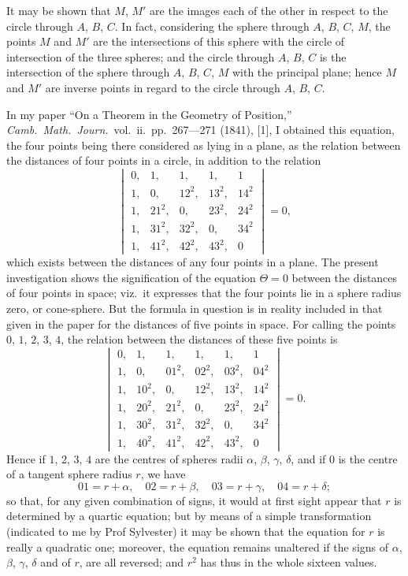 \documentclass[11pt,a4paper]{article}
\theoremstyle{plain}
\begin{document}
It may be shown that $M$, $M'$ are the images each of the other in respect to the circle through $A$, $B$, $C$. In fact, considering the sphere through $A$, $B$, $C$, $M$, the points $M$ and $M'$ are the intersections of this sphere with the circle of intersection of the three spheres; and the circle through $A$, $B$, $C$ is the intersection of the sphere through $A$, $B$, $C$, $M$ with the principal plane; hence $M$ and $M'$ are inverse points in regard to the circle through $A$, $B$, $C$.

\newpage
In my paper ``On a Theorem in the Geometry of Position,'' \textit{Camb.\ Math.\ Journ.}\ vol.\ ii.\ pp.\ 267---271 (1841), [1], I obtained this equation, the four points being there considered as lying in a plane, as the relation between the distances of four points in a circle, in addition to the relation
\[
\begin{vmatrix}
0, & 1, & 1, & 1, & 1 \\
1, & 0, & 12^2, & 13^2, & 14^2 \\
1, & 21^2, & 0, & 23^2, & 24^2 \\
1, & 31^2, & 32^2, & 0, & 34^2 \\
1, & 41^2, & 42^2, & 43^2, & 0
\end{vmatrix}
= 0,
\]
which exists between the distances of any four points in a plane. The present investigation shows the signification of the equation $\Theta = 0$ between the distances of four points in space; viz.\ it expresses that the four points lie in a sphere radius zero, or cone-sphere. But the formula in question is in reality included in that given in the paper for the distances of five points in space. For calling the points $0$, $1$, $2$, $3$, $4$, the relation between the distances of these five points is
\[
\begin{vmatrix}
0, & 1, & 1, & 1, & 1, & 1 \\
1, & 0, & 01^2, & 02^2, & 03^2, & 04^2 \\
1, & 10^2, & 0, & 12^2, & 13^2, & 14^2 \\
1, & 20^2, & 21^2, & 0, & 23^2, & 24^2 \\
1, & 30^2, & 31^2, & 32^2, & 0, & 34^2 \\
1, & 40^2, & 41^2, & 42^2, & 43^2, & 0
\end{vmatrix}
= 0.
\]
Hence if $1$, $2$, $3$, $4$ are the centres of spheres radii $\alpha$, $\beta$, $\gamma$, $\delta$, and if $0$ is the centre of a tangent sphere radius $r$, we have
\[
01 = r + \alpha, \quad 02 = r + \beta, \quad 03 = r + \gamma, \quad 04 = r + \delta;
\]
so that, for any given combination of signs, it would at first sight appear that $r$ is determined by a quartic equation; but by means of a simple transformation (indicated to me by Prof Sylvester) it may be shown that the equation for $r$ is really a quadratic one; moreover, the equation remains unaltered if the signs of $\alpha$, $\beta$, $\gamma$, $\delta$ and of $r$, are all reversed; and $r^2$ has thus in the whole sixteen values.
\end{document}
